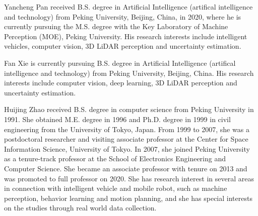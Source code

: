 \documentclass[journal]{IEEEtran}
\begin{document}
\vspace{-12 mm}
\begin{IEEEbiography}
	{Yancheng Pan}
	received B.S. degree in Artificial Intelligence (artifical intelligence and technology) from Peking University, Beijing, China, in 2020, where he is currently pursuing the M.S. degree with the Key Laboratory of Machine Perception (MOE), Peking University.
	His research interests include intelligent vehicles, computer vision, 3D LiDAR perception and uncertainty estimation.
\end{IEEEbiography}

\vspace{-18 mm}
\begin{IEEEbiography}
	{Fan Xie}
	 is currently pursuing B.S. degree in Artificial Intelligence (artifical intelligence and technology) from Peking University, Beijing, China. His research interests include computer vision, deep learning, 3D LiDAR perception and uncertainty estimation.
\end{IEEEbiography}

\vspace{-18 mm}
\begin{IEEEbiography}
	{Huijing Zhao}
	received B.S. degree in computer science from Peking University in 1991. She obtained M.E. degree in 1996 and Ph.D. degree in 1999 in civil engineering from the University of Tokyo, Japan. From 1999 to 2007, she was a postdoctoral researcher and visiting associate professor at the Center for Space Information Science, University of Tokyo. In 2007, she joined Peking University as a tenure-track professor at the School of Electronics Engineering and Computer Science. She became an associate professor with tenure on 2013 and was promoted to full professor on 2020. She has research interest in several areas in connection with intelligent vehicle and mobile robot, such as machine perception, behavior learning and motion planning, and she has special interests on the studies through real world data collection.
\end{IEEEbiography}


\end{document}
